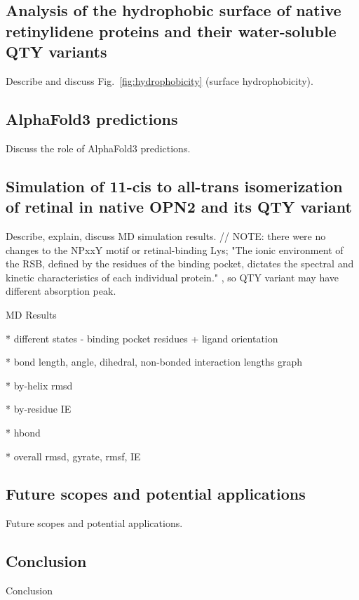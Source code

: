 \documentclass[fleqn,10pt]{manuscript}
\begin{document}
\subsection*{Analysis of the hydrophobic surface of native retinylidene proteins and their water-soluble QTY variants}

Describe and discuss Fig.~\ref{fig:hydrophobicity} (surface hydrophobicity). 

\subsection*{AlphaFold3 predictions}

Discuss the role of AlphaFold3 predictions. 

\subsection*{Simulation of 11-cis to all-trans isomerization of retinal in native OPN2 and its QTY variant}

Describe, explain, discuss MD simulation results. // NOTE: there were no changes to the NPxxY motif or retinal-binding Lys; "The ionic environment of the RSB, defined by the residues of the binding pocket, dictates the spectral and kinetic characteristics of each individual protein." \citep{Fenno_2011}, so QTY variant may have different absorption peak. 

MD Results

* different states - binding pocket residues + ligand orientation

* bond length, angle, dihedral, non-bonded interaction lengths graph

* by-helix rmsd

* by-residue IE

* hbond

* overall rmsd, gyrate, rmsf, IE

\subsection*{Future scopes and potential applications}

Future scopes and potential applications. 

\subsection*{Conclusion}

Conclusion
\end{document}
